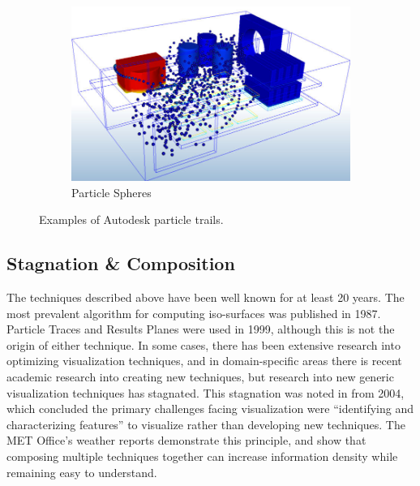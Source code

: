 \begin{figure}[p]
    \begin{subfigure}{0.9\textwidth}%
        \includegraphics[width=\linewidth]{Ch20Research/figures/autodesk_particle_spheres.jpg}
        \caption{Particle Spheres}
    \end{subfigure}%
    \caption{Examples of Autodesk particle trails.}
    \label{fig:AutodeskCFDParticles}
\end{figure}

\pagebreak
\subsection{Stagnation \& Composition}
The techniques described above have been well known for at least 20 years.
The most prevalent algorithm for computing iso-surfaces was published in 1987\cite{LorensenMarching}.
Particle Traces and Results Planes were used in 1999\cite{Schulz1999}, although this is not the origin of either technique.
In some cases, there has been extensive research into optimizing visualization techniques\cite{Ueng1996}, and in domain-specific areas there is recent academic research into creating new techniques\cite{Chen16}, but research into new generic visualization techniques has stagnated.
This stagnation was noted in \cite{vizRole2004} from 2004, which concluded the primary challenges facing visualization were ``identifying and characterizing features'' to visualize rather than developing new techniques.
The MET Office's weather reports demonstrate this principle, and show that composing multiple techniques together can increase information density while remaining easy to understand.

